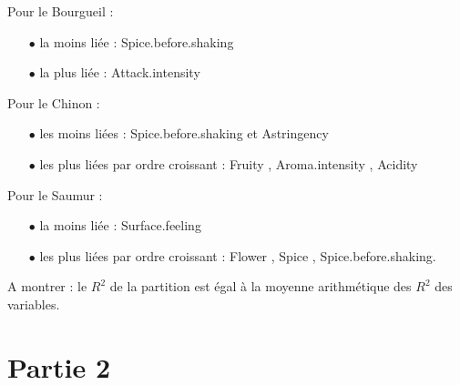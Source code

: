 \documentclass{article}
\begin{document}
\begin{enumerate}
Pour le Bourgueil :
\begin{itemize}
\item[$\bullet$] la moins liée : Spice.before.shaking
\item[$\bullet$] la plus liée : Attack.intensity  
\end{itemize}

Pour le Chinon :
\begin{itemize}
\item[$\bullet$] les moins liées : Spice.before.shaking et Astringency 
\item[$\bullet$] les plus liées par ordre croissant : Fruity , Aroma.intensity , Acidity   
\end{itemize}

Pour le Saumur :
\begin{itemize}
\item[$\bullet$] la moins liée : Surface.feeling 
\item[$\bullet$] les plus liées par ordre croissant : Flower , Spice , Spice.before.shaking. 
\end{itemize}

A montrer : le $R^2$ de la partition est égal à la moyenne arithmétique des $R^2$ des variables.
\end{enumerate}

\section{Partie 2}
\end{document}
